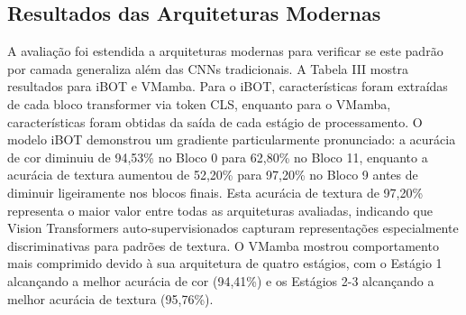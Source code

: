 \documentclass[conference]{IEEEtran}
\begin{document}
\subsection{Resultados das Arquiteturas Modernas}

A avalia\c{c}\~{a}o foi estendida a arquiteturas modernas para verificar se este padr\~{a}o por camada generaliza al\'{e}m das CNNs tradicionais. A Tabela III mostra resultados para iBOT e VMamba. Para o iBOT, caracter\'{i}sticas foram extra\'{i}das de cada bloco transformer via token CLS, enquanto para o VMamba, caracter\'{i}sticas foram obtidas da sa\'{i}da de cada est\'{a}gio de processamento. O modelo iBOT demonstrou um gradiente particularmente pronunciado: a acur\'{a}cia de cor diminuiu de 94,53\% no Bloco 0 para 62,80\% no Bloco 11, enquanto a acur\'{a}cia de textura aumentou de 52,20\% para 97,20\% no Bloco 9 antes de diminuir ligeiramente nos blocos finais. Esta acur\'{a}cia de textura de 97,20\% representa o maior valor entre todas as arquiteturas avaliadas, indicando que Vision Transformers auto-supervisionados capturam representa\c{c}\~{o}es especialmente discriminativas para padr\~{o}es de textura. O VMamba mostrou comportamento mais comprimido devido \`{a} sua arquitetura de quatro est\'{a}gios, com o Est\'{a}gio 1 alcan\c{c}ando a melhor acur\'{a}cia de cor (94,41\%) e os Est\'{a}gios 2-3 alcan\c{c}ando a melhor acur\'{a}cia de textura (95,76\%).
\end{document}
